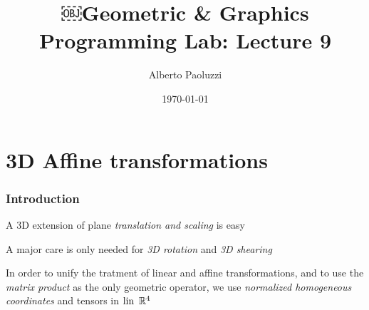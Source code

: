 \documentclass{beamer}
\title{￼Geometric \& Graphics Programming Lab: Lecture 9}
\author{Alberto Paoluzzi}
\date{\today}
\begin{document}
\frame{\titlepage}

\section[Outline]{}
\frame{\tableofcontents}



\section{3D Affine transformations}

\begin{frame}\frametitle{Introduction}

\vfill


A 3D extension of plane \emph{translation and scaling} is easy

\vfill

A major care is only needed for \emph{3D rotation} and \emph{3D shearing}

\vfill

In order to unify the tratment of linear and affine transformations, and to use the \emph{matrix product} as the only geometric operator,  we use \emph{normalized homogeneous coordinates} and tensors in \emph{$\mbox{\rm lin}\,\ \mathbb{R}^4$} 

\vfill
\end{frame}
\end{document}
